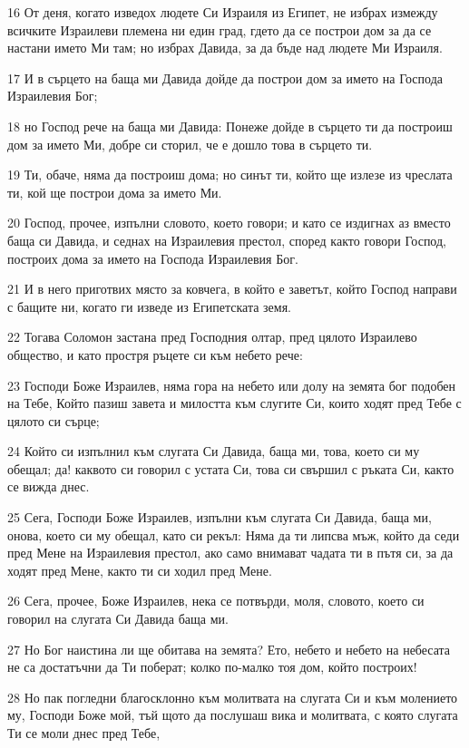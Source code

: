 \par 16 От деня, когато изведох людете Си Израиля из Египет, не избрах измежду всичките Израилеви племена ни един град, гдето да се построи дом за да се настани името Ми там; но избрах Давида, за да бъде над людете Ми Израиля.
\par 17 И в сърцето на баща ми Давида дойде да построи дом за името на Господа Израилевия Бог;
\par 18 но Господ рече на баща ми Давида: Понеже дойде в сърцето ти да построиш дом за името Ми, добре си сторил, че е дошло това в сърцето ти.
\par 19 Ти, обаче, няма да построиш дома; но синът ти, който ще излезе из чреслата ти, кой ще построи дома за името Ми.
\par 20 Господ, прочее, изпълни словото, което говори; и като се издигнах аз вместо баща си Давида, и седнах на Израилевия престол, според както говори Господ, построих дома за името на Господа Израилевия Бог.
\par 21 И в него приготвих място за ковчега, в който е заветът, който Господ направи с бащите ни, когато ги изведе из Египетската земя.
\par 22 Тогава Соломон застана пред Господния олтар, пред цялото Израилево общество, и като простря ръцете си към небето рече:
\par 23 Господи Боже Израилев, няма гора на небето или долу на земята бог подобен на Тебе, Който пазиш завета и милостта към слугите Си, които ходят пред Тебе с цялото си сърце;
\par 24 Който си изпълнил към слугата Си Давида, баща ми, това, което си му обещал; да! каквото си говорил с устата Си, това си свършил с ръката Си, както се вижда днес.
\par 25 Сега, Господи Боже Израилев, изпълни към слугата Си Давида, баща ми, онова, което си му обещал, като си рекъл: Няма да ти липсва мъж, който да седи пред Мене на Израилевия престол, ако само внимават чадата ти в пътя си, за да ходят пред Мене, както ти си ходил пред Мене.
\par 26 Сега, прочее, Боже Израилев, нека се потвърди, моля, словото, което си говорил на слугата Си Давида баща ми.
\par 27 Но Бог наистина ли ще обитава на земята? Ето, небето и небето на небесата не са достатъчни да Ти поберат; колко по-малко тоя дом, който построих!
\par 28 Но пак погледни благосклонно към молитвата на слугата Си и към молението му, Господи Боже мой, тъй щото да послушаш вика и молитвата, с която слугата Ти се моли днес пред Тебе,
